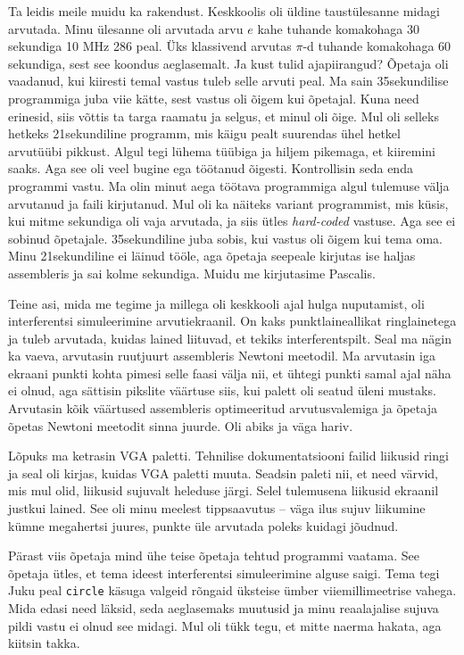 Ta leidis meile muidu ka rakendust. Keskkoolis oli üldine taustülesanne midagi
arvutada. Minu ülesanne oli arvutada arvu $e$ kahe tuhande komakohaga 30
sekundiga 10 MHz 286 peal. Üks klassivend arvutas $\pi$-d tuhande komakohaga 60
sekundiga, sest see koondus aeglasemalt. Ja kust tulid ajapiirangud? Õpetaja
oli vaadanud, kui kiiresti temal vastus tuleb selle arvuti peal. Ma sain
35sekundilise programmiga juba viie kätte, sest vastus oli õigem kui õpetajal.
Kuna need erinesid, siis võttis ta targa raamatu ja selgus, et minul oli
õige. Mul oli selleks hetkeks 21sekundiline programm, mis käigu pealt
suurendas ühel hetkel arvutüübi pikkust. Algul tegi lühema tüübiga ja hiljem
pikemaga, et kiiremini saaks. Aga see oli veel bugine ega töötanud õigesti.
Kontrollisin seda enda programmi vastu. Ma olin minut aega töötava
programmiga algul tulemuse välja arvutanud ja faili kirjutanud. Mul oli
ka näiteks variant programmist, mis küsis, kui mitme sekundiga oli vaja
arvutada, ja siis ütles \emph{hard-coded} vastuse. Aga see ei sobinud õpetajale.
35sekundiline juba sobis, kui vastus oli õigem kui tema oma. Minu
21sekundiline ei läinud tööle, aga õpetaja seepeale kirjutas ise
haljas assembleris ja sai kolme sekundiga. Muidu
me kirjutasime Pascalis.

Teine asi, mida me tegime ja millega oli keskkooli ajal hulga nuputamist, oli
interferentsi simuleerimine arvutiekraanil. On kaks punktlaineallikat
ringlainetega ja tuleb arvutada, kuidas lained liituvad, et tekiks
interferentspilt. Seal ma nägin ka vaeva, arvutasin ruutjuurt
assembleris Newtoni meetodil. Ma arvutasin iga ekraani
punkti kohta pimesi selle faasi välja nii, et ühtegi punkti samal ajal näha ei
olnud, aga sättisin pikslite väärtuse siis, kui palett oli seatud üleni mustaks.
Arvutasin kõik väärtused assembleris optimeeritud arvutusvalemiga ja õpetaja
õpetas Newtoni meetodit sinna juurde. Oli abiks ja väga hariv.

Lõpuks ma ketrasin VGA paletti. Tehnilise dokumentatsiooni failid
liikusid ringi ja seal oli kirjas, kuidas VGA paletti muuta. Seadsin paleti
nii, et need värvid, mis mul olid, liikusid sujuvalt heleduse järgi. 
Selel tulemusena liikusid ekraanil justkui lained. See oli minu meelest
tippsaavutus -- väga ilus sujuv liikumine kümne megahertsi juures,
punkte üle arvutada poleks kuidagi jõudnud. 

Pärast viis õpetaja mind ühe teise
õpetaja tehtud programmi vaatama. See õpetaja ütles, et tema ideest interferentsi simuleerimine alguse saigi. Tema tegi Juku peal \verb|circle|
käsuga valgeid rõngaid üksteise ümber viiemillimeetrise vahega. Mida edasi need läksid,
seda aeglasemaks muutusid ja minu reaalajalise sujuva pildi vastu ei olnud
see midagi. Mul oli tükk tegu, et mitte naerma hakata, aga kiitsin takka.

